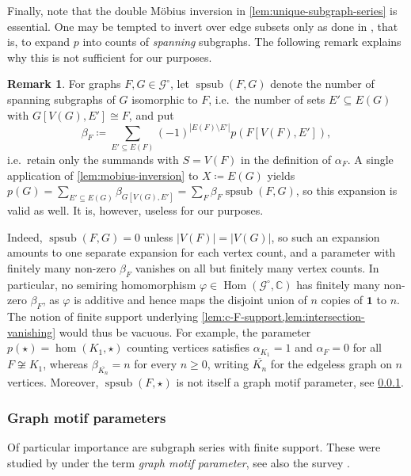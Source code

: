 \documentclass[11pt]{scrartcl}
\theoremstyle{definition}
\newtheorem{remark}[definition]{Remark}
\theoremstyle{plain}
\theoremstyle{remark}
\renewcommand\phi\varphi
\DeclareMathOperator\Hom{Hom}
\DeclareMathOperator{\spsub}{spsub}
\newcommand{\lG}{\mathcal{G}^\circ}
\begin{document}
	Finally, note that the double M\"obius inversion in \cref{lem:unique-subgraph-series} is essential.
	One may be tempted to invert over edge subsets only as done in \cite[Section 4.1]{lovasz_large_2012},
	that is, to expand $p$ into counts of \emph{spanning} subgraphs.
	The following remark explains why this is not sufficient for our purposes.

	\begin{remark}\label{rem:spanning-insufficient}
		For graphs $F, G \in \lG$, let $\spsub(F, G)$ denote the number of spanning subgraphs of $G$ isomorphic to $F$,
		i.e.\ the number of sets $E' \subseteq E(G)$ with $G[V(G), E'] \cong F$,
		and put
		\[
			\beta_F \coloneqq \sum_{E' \subseteq E(F)} (-1)^{|E(F) \setminus E'|} p(F[V(F), E']),
		\]
		i.e.\ retain only the summands with $S = V(F)$ in the definition of $\alpha_F$.
		A single application of \cref{lem:mobius-inversion} to $X \coloneqq E(G)$ yields
		$p(G) = \sum_{E' \subseteq E(G)} \beta_{G[V(G), E']} = \sum_F \beta_F \spsub(F, G)$,
		so this expansion is valid as well.
		It is, however, useless for our purposes.

		Indeed, $\spsub(F, G) = 0$ unless $|V(F)| = |V(G)|$,
		so such an expansion amounts to one separate expansion for each vertex count,
		and a parameter with finitely many non-zero $\beta_F$ vanishes on all but finitely many vertex counts.
		In particular, no semiring homomorphism $\phi \in \Hom(\lG, \mathbb{C})$ has finitely many non-zero $\beta_F$,
		as $\phi$ is additive and hence maps the disjoint union of $n$ copies of $\boldsymbol{1}$ to $n$.
		The notion of finite support underlying \cref{lem:c-F-support,lem:intersection-vanishing} would thus be vacuous.
		For example, the parameter $p(\star) = \hom(K_1, \star)$ counting vertices
		satisfies $\alpha_{K_1} = 1$ and $\alpha_F = 0$ for all $F \not\cong K_1$,
		whereas $\beta_{\overline{K_n}} = n$ for every $n \geq 0$, writing $\overline{K_n}$ for the edgeless graph on $n$ vertices.
		Moreover, $\spsub(F, \star)$ is not itself a graph motif parameter, see \cref{sec:gmp}.
\end{remark}
	
	\subsubsection{Graph motif parameters}
	\label{sec:gmp}

	Of particular importance are subgraph series with finite support.
	These were studied by \textcite{curticapean_homomorphisms_2017} under the term \emph{graph motif parameter}, see also the survey \cite{roth_parameterised_2026}.
\end{document}
